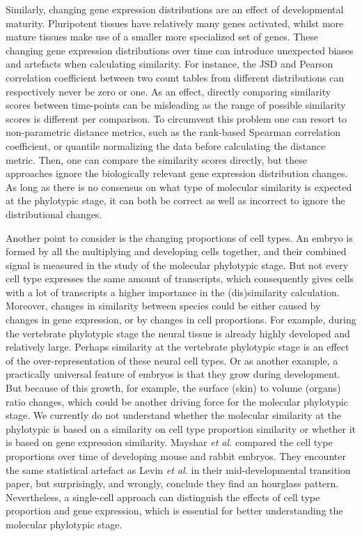 Similarly, changing gene expression distributions are an effect of developmental maturity\cite{Kannan2021}. Pluripotent tissues have relatively many genes activated, whilst more mature tissues make use of a smaller more specialized set of genes. These changing gene expression distributions over time can introduce unexpected biases and artefacts when calculating similarity. For instance, the JSD and Pearson correlation coefficient between two count tables from different distributions can respectively never be zero or one. As an effect, directly comparing similarity scores between time-points can be misleading as the range of possible similarity scores is different per comparison. To circumvent this problem one can resort to non-parametric distance metrics, such as the rank-based Spearman correlation coefficient\cite{Irie2011}, or quantile normalizing the data before calculating the distance metric\cite{marletaz2018}. Then, one can compare the similarity scores directly, but these approaches ignore the biologically relevant gene expression distribution changes. As long as there is no consensus on what type of molecular similarity is expected at the phylotypic stage, it can both be correct as well as incorrect to ignore the distributional changes. 

Another point to consider is the changing proportions of cell types. An embryo is formed by all the multiplying and developing cells together, and their combined signal is measured in the study of the molecular phylotypic stage. But not every cell type expresses the same amount of transcripts\cite{Kim2023, Percharde2017}, which consequently gives cells with a lot of transcripts a higher importance in the (dis)similarity calculation. Moreover, changes in similarity between species could be either caused by changes in gene expression, or by changes in cell proportions. For example, during the vertebrate phylotypic stage the neural tissue is already highly developed and relatively large. Perhaps similarity at the vertebrate phylotypic stage is an effect of the over-representation of these neural cell types. Or as another example, a practically universal feature of embryos is that they grow during development. But because of this growth, for example, the surface (skin) to volume (organs) ratio changes, which could be another driving force for the molecular phylotypic stage. We currently do not understand whether the molecular similarity at the phylotypic is based on a similarity on cell type proportion similarity or whether it is based on gene expression similarity. Mayshar \textit{et al.} compared the cell type proportions over time of developing mouse and rabbit embryos. They encounter the same statistical artefact as Levin \textit{et al.} in their mid-developmental transition paper, but surprisingly, and wrongly, conclude they find an hourglass pattern\cite{Mayshar2023}. Nevertheless, a single-cell approach can distinguish the effects of cell type proportion and gene expression, which is essential for better understanding the molecular phylotypic stage.

